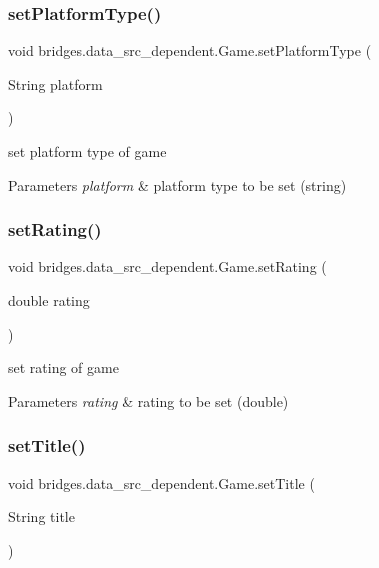 \subsubsection{\texorpdfstring{set\+Platform\+Type()}{setPlatformType()}}
{\footnotesize\ttfamily void bridges.\+data\+\_\+src\+\_\+dependent.\+Game.\+set\+Platform\+Type (\begin{DoxyParamCaption}\item[{String}]{platform }\end{DoxyParamCaption})}

set platform type of game 
\begin{DoxyParams}{Parameters}
{\em platform} & platform type to be set (string) \\
\hline
\end{DoxyParams}
\mbox{\label{classbridges_1_1data__src__dependent_1_1_game_ab59c6ea5ee2721dcca2246e8e287154f}} 
\subsubsection{\texorpdfstring{set\+Rating()}{setRating()}}
{\footnotesize\ttfamily void bridges.\+data\+\_\+src\+\_\+dependent.\+Game.\+set\+Rating (\begin{DoxyParamCaption}\item[{double}]{rating }\end{DoxyParamCaption})}

set rating of game 
\begin{DoxyParams}{Parameters}
{\em rating} & rating to be set (double) \\
\hline
\end{DoxyParams}
\mbox{\label{classbridges_1_1data__src__dependent_1_1_game_a0c87151b75bc10357aa6829ebfc0cae3}} 
\subsubsection{\texorpdfstring{set\+Title()}{setTitle()}}
{\footnotesize\ttfamily void bridges.\+data\+\_\+src\+\_\+dependent.\+Game.\+set\+Title (\begin{DoxyParamCaption}\item[{String}]{title }\end{DoxyParamCaption})}

